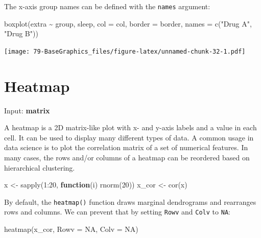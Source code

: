 \documentclass[
]{book}
\newenvironment{Shaded}{\begin{snugshade}}{\end{snugshade}}
\newcommand{\AttributeTok}[1]{\textcolor[rgb]{0.77,0.63,0.00}{#1}}
\newcommand{\ConstantTok}[1]{\textcolor[rgb]{0.00,0.00,0.00}{#1}}
\newcommand{\ControlFlowTok}[1]{\textcolor[rgb]{0.13,0.29,0.53}{\textbf{#1}}}
\newcommand{\DecValTok}[1]{\textcolor[rgb]{0.00,0.00,0.81}{#1}}
\newcommand{\FunctionTok}[1]{\textcolor[rgb]{0.00,0.00,0.00}{#1}}
\newcommand{\NormalTok}[1]{#1}
\newcommand{\OtherTok}[1]{\textcolor[rgb]{0.56,0.35,0.01}{#1}}
\newcommand{\SpecialCharTok}[1]{\textcolor[rgb]{0.00,0.00,0.00}{#1}}
\newcommand{\StringTok}[1]{\textcolor[rgb]{0.31,0.60,0.02}{#1}}
\begin{document}
The x-axis group names can be defined with the \texttt{names} argument:

\begin{Shaded}
\begin{Highlighting}[]
\FunctionTok{boxplot}\NormalTok{(extra }\SpecialCharTok{\textasciitilde{}}\NormalTok{ group, sleep,}
        \AttributeTok{col =}\NormalTok{ col, }\AttributeTok{border =}\NormalTok{ border,}
        \AttributeTok{names =} \FunctionTok{c}\NormalTok{(}\StringTok{"Drug A"}\NormalTok{, }\StringTok{"Drug B"}\NormalTok{))}
\end{Highlighting}
\end{Shaded}

\texttt{[image: 79-BaseGraphics\_files/figure-latex/unnamed-chunk-32-1.pdf]}

\hypertarget{heatmap}{%
\section{Heatmap}\label{heatmap}}

Input: \textbf{matrix}

A heatmap is a 2D matrix-like plot with x- and y-axis labels and a value in each cell. It can be used to display many different types of data. A common usage in data science is to plot the correlation matrix of a set of numerical features. In many cases, the rows and/or columns of a heatmap can be reordered based on hierarchical clustering.

\begin{Shaded}
\begin{Highlighting}[]
\NormalTok{x }\OtherTok{\textless{}{-}} \FunctionTok{sapply}\NormalTok{(}\DecValTok{1}\SpecialCharTok{:}\DecValTok{20}\NormalTok{, }\ControlFlowTok{function}\NormalTok{(i) }\FunctionTok{rnorm}\NormalTok{(}\DecValTok{20}\NormalTok{))}
\NormalTok{x\_cor }\OtherTok{\textless{}{-}} \FunctionTok{cor}\NormalTok{(x)}
\end{Highlighting}
\end{Shaded}

By default, the \texttt{heatmap()} function draws marginal dendrograms and rearranges rows and columns. We can prevent that by setting \texttt{Rowv} and \texttt{Colv} to \texttt{NA}:

\begin{Shaded}
\begin{Highlighting}[]
\FunctionTok{heatmap}\NormalTok{(x\_cor, }\AttributeTok{Rowv =} \ConstantTok{NA}\NormalTok{, }\AttributeTok{Colv =} \ConstantTok{NA}\NormalTok{)}
\end{Highlighting}
\end{Shaded}
\end{document}
